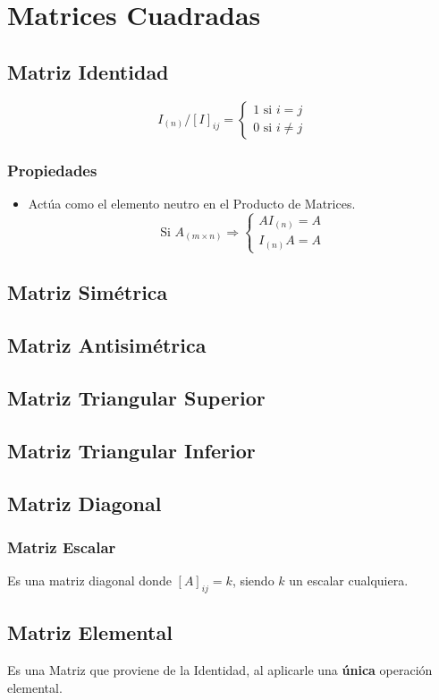 \section{Matrices Cuadradas}
\subsection{Matriz Identidad}
$$I_{(n)}/[I]_{ij}=
\begin{cases} 
1 \text{ si } i=j \\
0 \text{ si } i\neq j
\end{cases}
$$
\subsubsection{Propiedades}
\begin{itemize}
\item Actúa como el elemento neutro en el Producto de Matrices.
$$
\text{Si } A_{(m\times n)} \Rightarrow
\begin{cases} 
AI_{(n)} = A\\
I_{(n)}A = A

\end{cases}
$$
\end{itemize}
\subsection{Matriz Simétrica}
\subsection{Matriz Antisimétrica}
\subsection{Matriz Triangular Superior}
\subsection{Matriz Triangular Inferior}
\subsection{Matriz Diagonal}
\subsubsection{Matriz Escalar}
Es una matriz diagonal donde $[A]_{ij}=k$, siendo $k$ un escalar cualquiera.
\subsection{Matriz Elemental}
Es una Matriz que proviene de la Identidad, al aplicarle una \textbf{única} operación elemental.

